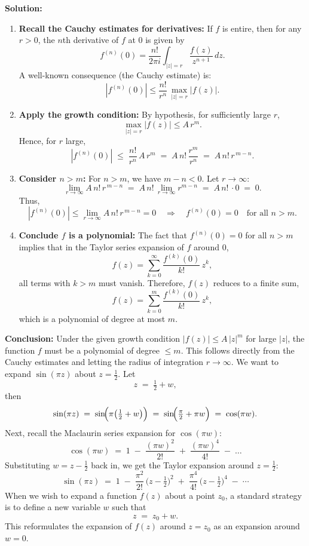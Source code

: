 \documentclass[12pt]{article}
\theoremstyle{definition} %
\theoremstyle{plain} %
\begin{document}
\bigskip

\textbf{Solution:}

\begin{enumerate}
\item \textbf{Recall the Cauchy estimates for derivatives:}  
If $f$ is entire, then for any $r > 0$, the $n$th derivative of $f$ at $0$ is given by
\[
f^{(n)}(0)
= 
\frac{n!}{2\pi i} \int_{|z|=r} \frac{f(z)}{z^{n+1}}\, dz.
\]
A well-known consequence (the Cauchy estimate) is:
\[
|f^{(n)}(0)|
\le 
\frac{n!}{r^n} \,\max_{|z|=r} |f(z)|.
\]

\item \textbf{Apply the growth condition:}  
By hypothesis, for sufficiently large $r$, 
\[
\max_{|z|=r} |f(z)| \le A\,r^m.
\]
Hence, for $r$ large,
\[
|f^{(n)}(0)|
\;\le\; 
\frac{n!}{r^n}\, A\,r^m
\;=\;
A\,n!\,\frac{r^m}{r^n}
\;=\;
A\,n!\,r^{\,m-n}.
\]

\item \textbf{Consider $n > m$:}  
For $n > m$, we have $m - n < 0$. Let $r \to \infty$:
\[
\lim_{r \to \infty} A\,n!\,r^{\,m-n} 
\;=\;
A\,n!\,\lim_{r \to \infty} r^{m-n}
\;=\;
A\,n!\,\cdot 0
\;=\;
0.
\]
Thus,
\[
|f^{(n)}(0)| \le \lim_{r \to \infty} A\,n!\,r^{\,m-n} 
= 
0
\quad
\Longrightarrow
\quad
f^{(n)}(0) = 0
\quad
\text{for all } n > m.
\]

\item \textbf{Conclude $f$ is a polynomial:}  
The fact that $f^{(n)}(0) = 0$ for all $n > m$ implies that in the Taylor series expansion of $f$ around $0$,
\[
f(z) = \sum_{k=0}^{\infty} \frac{f^{(k)}(0)}{k!} \, z^k,
\]
all terms with $k > m$ must vanish. Therefore, $f(z)$ reduces to a finite sum,
\[
f(z) = \sum_{k=0}^{m} \frac{f^{(k)}(0)}{k!} \, z^k,
\]
which is a polynomial of degree at most $m$.

\end{enumerate}

\bigskip

\textbf{Conclusion:}  
Under the given growth condition $|f(z)| \le A\,|z|^m$ for large $|z|$, the function $f$ must be a polynomial of degree $\le m$. This follows directly from the Cauchy estimates and letting the radius of integration $r \to \infty$.
We want to expand $\sin(\pi z)$ about $z = \tfrac12$. Let
\[
  z \;=\; \tfrac12 + w,
\]
then
\[
  \sin(\pi z)
  \;=\;
  \sin\!\Bigl(\pi\bigl(\tfrac12 + w\bigr)\Bigr)
  \;=\;
  \sin\!\Bigl(\tfrac{\pi}{2} + \pi w\Bigr)
  \;=\;
  \cos(\pi w).
\]
Next, recall the Maclaurin series expansion for $\cos(\pi w)$:
\[
  \cos(\pi w)
  \;=\;
  1
  \;-\;
  \frac{(\pi w)^{2}}{2!}
  \;+\;
  \frac{(\pi w)^{4}}{4!}
  \;-\;
  \dots
\]
Substituting $w = z - \tfrac12$ back in, we get the Taylor expansion around $z = \tfrac12$:
\[
  \sin(\pi z)
  \;=\;
  1
  \;-\;
  \frac{\pi^2}{2!}\,\bigl(z - \tfrac12\bigr)^2
  \;+\;
  \frac{\pi^4}{4!}\,\bigl(z - \tfrac12\bigr)^4
  \;-\;
  \cdots
\]
When we wish to expand a function $f(z)$ about a point $z_0$, a standard strategy is to define a new variable $w$ such that
\[
   z \;=\; z_0 + w.
\]
This reformulates the expansion of $f(z)$ around $z=z_0$ as an expansion around $w=0$. 
\end{document}
